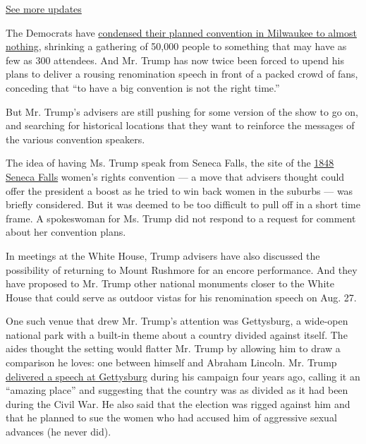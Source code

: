 \href{https://www.nytimes.com/2020/08/03/us/elections/biden-vs-trump.html?action=click\&pgtype=Article\&state=default\&region=MAIN_CONTENT_1\&context=storylines_live_updates}{See
more updates}

The Democrats have
\href{https://www.nytimes.com/2020/07/17/us/politics/democratic-convention-milwaukee.html}{condensed
their planned convention in Milwaukee to almost nothing,} shrinking a
gathering of 50,000 people to something that may have as few as 300
attendees. And Mr. Trump has now twice been forced to upend his plans to
deliver a rousing renomination speech in front of a packed crowd of
fans, conceding that ``to have a big convention is not the right time.''

But Mr. Trump's advisers are still pushing for some version of the show
to go on, and searching for historical locations that they want to
reinforce the messages of the various convention speakers.

The idea of having Ms. Trump speak from Seneca Falls, the site of the
\href{https://www.history.com/topics/womens-rights/seneca-falls-convention}{1848
Seneca Falls} women's rights convention --- a move that advisers thought
could offer the president a boost as he tried to win back women in the
suburbs --- was briefly considered. But it was deemed to be too
difficult to pull off in a short time frame. A spokeswoman for Ms. Trump
did not respond to a request for comment about her convention plans.

In meetings at the White House, Trump advisers have also discussed the
possibility of returning to Mount Rushmore for an encore performance.
And they have proposed to Mr. Trump other national monuments closer to
the White House that could serve as outdoor vistas for his renomination
speech on Aug. 27.

One such venue that drew Mr. Trump's attention was Gettysburg, a
wide-open national park with a built-in theme about a country divided
against itself. The aides thought the setting would flatter Mr. Trump by
allowing him to draw a comparison he loves: one between himself and
Abraham Lincoln. Mr. Trump
\href{https://www.nytimes.com/2016/10/23/us/politics/donald-trump-hillary-clinton.html}{delivered
a speech at Gettysburg} during his campaign four years ago, calling it
an ``amazing place'' and suggesting that the country was as divided as
it had been during the Civil War. He also said that the election was
rigged against him and that he planned to sue the women who had accused
him of aggressive sexual advances (he never did).

